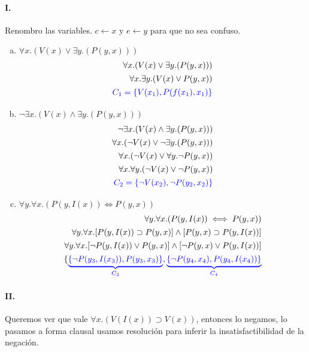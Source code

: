 \documentclass[10pt,a4paper]{article}
\begin{document}
\paragraph{I.} Renombro las variables. $c\leftarrow x$ y $e\leftarrow y$ para que no sea confuso.
\begin{enumerate}[a)]
\item $\forall x. ( V(x) \lor \exists y.(P(y, x)))$
\begin{align*}
\forall x. ( V(x) \lor \exists y.(P(y, x))) \\[1pt]
\forall x.\exists y. ( V(x) \lor P(y, x)) \\[1pt]
{\color{blue}C_1 = \{V(x_1), P(f(x_1), x_1)\}} \\[1pt]
\end{align*}
\item $\lnot \exists x.(V (x) \land \exists y.(P(y, x)))$
\begin{align*}
\lnot \exists x.(V (x) \land \exists y.(P(y, x)))\\[1pt]
\forall x.(\lnot V(x) \lor \lnot\exists y.(P(y, x)))\\[1pt]
\forall x.(\lnot V(x) \lor \forall y.\lnot P(y, x))\\[1pt]
\forall x.\forall y.(\lnot V(x) \lor \lnot P(y, x))\\[1pt]
{\color{blue}C_2 = \{\lnot V(x_2) , \lnot P(y_2, x_2)\}}\\[1pt]
\end{align*}
\item $\forall y.\forall x.(P(y, I(x)) \iff P(y, x))$
\begin{align*}
\forall y.\forall x.(P(y, I(x)) \iff P(y, x)) \\[1pt]
\forall y.\forall x.[P(y, I(x)) \supset P(y, x)]\land [P(y, x)\supset P(y, I(x)) ] \\[1pt]
\forall y.\forall x.[\lnot P(y, I(x)) \lor P(y, x)]\land [\lnot P(y, x)\lor P(y, I(x)) ] \\[1pt]
\{{\color{blue}\underbrace{\{\lnot P(y_3, I(x_3)), P(y_3, x_3)\}}_{C_3}},{\color{blue}\underbrace{\{\lnot P(y_4, x_4), P(y_4, I(x_4))\}}_{C_4}}\\[1pt]
\end{align*}
\end{enumerate}

\paragraph{II.} Queremos ver que vale  $\forall x.(V (I(x)) \supset V (x))$, entonces lo negamos, lo pasamos a forma clausal usamos resolución para inferir la insatisfactibilidad de la negación.
\end{document}
